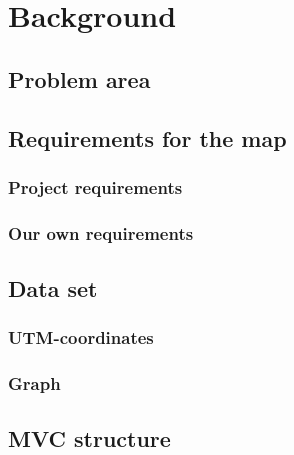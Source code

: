 \chapter{Background}
\label{BG}
\section{Problem area}
\label{BG-PR}

\section{Requirements for the map}
\label{BG-R}
\subsection{Project requirements}
\label{BG-R-PR}
\subsection{Our own requirements}
\label{BG-R-OOR}

\section{Data set}
\label{BG-DS}
\subsection{UTM-coordinates}
\label{BG-DS-UTM}
\subsection{Graph}
\label{BG-DS-G}

\section{MVC structure}
\label{BG-MVC}